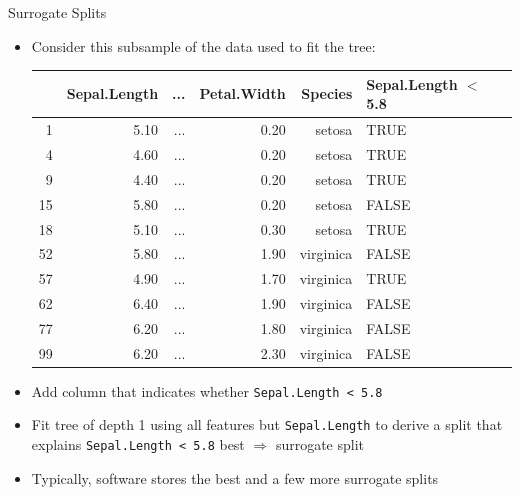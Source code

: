 \documentclass[11pt,compress,t,notes=noshow, xcolor=table]{beamer}
\begin{document}
\begin{framev}{Surrogate Splits}
\begin{itemize}
\item Consider this subsample of the data used to fit the tree:
\begin{table}[ht]
\tiny
\centering
\begin{tabular}{rrrrrll}
  \hline
 & Sepal.Length & ... & Petal.Width & Species & Sepal.Length $<$ 5.8 \\ 
  \hline
1 & 5.10 & ... & 0.20 & setosa & TRUE \\ 
  4 & 4.60 & ... & 0.20 & setosa & TRUE \\ 
  9 & 4.40 & ... & 0.20 & setosa & TRUE \\ 
  15 & 5.80 & ... & 0.20 & setosa & FALSE \\ 
  18 & 5.10 & ... & 0.30 & setosa & TRUE \\ 
  52 & 5.80 & ... & 1.90 & virginica & FALSE \\ 
  57 & 4.90 & ... & 1.70 & virginica & TRUE \\ 
  62 & 6.40 & ... & 1.90 & virginica & FALSE \\ 
  77 & 6.20 & ... & 1.80 & virginica & FALSE \\ 
  99 & 6.20 & ... & 2.30 & virginica & FALSE \\ 
   \hline
\end{tabular}
\end{table}
\item Add column that indicates whether \texttt{Sepal.Length < 5.8}
\item Fit tree of depth 1 using all features but \texttt{Sepal.Length} %
to derive a split that explains 
\texttt{Sepal.Length < 5.8} best $\Rightarrow$ surrogate split
\item Typically, software stores the best and a few more surrogate splits

\end{itemize}


\end{framev}


\endlecture
\end{document}
